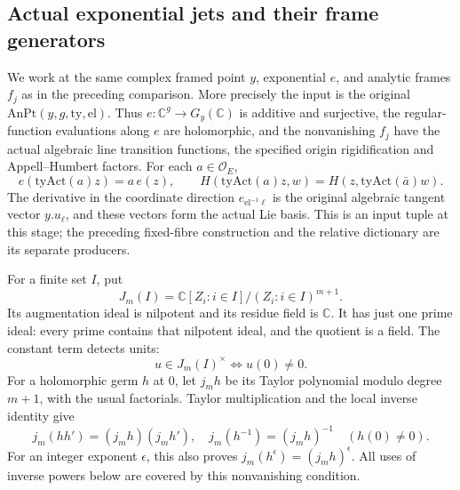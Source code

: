 \subsection{Actual exponential jets and their frame generators}
\label{subsec:ftb-actual-exponential-jets}

We work at the same complex framed point \(y\), exponential \(e\),
and analytic frames \(f_j\) as in the preceding comparison.
More precisely the input is the original \(\mathrm{AnPt}(y,g,\mathrm{ty},\mathrm{el})\).
Thus \(e:\mathbb C^g\to G_y(\mathbb C)\) is additive and surjective,
the regular-function evaluations along \(e\) are holomorphic,
and the nonvanishing \(f_j\) have the actual algebraic line
transition functions, the specified origin rigidification and
Appell--Humbert factors.
For each \(a\in\mathcal O_E\),
\[
 e(\mathrm{tyAct}(a)z)=a\,e(z),\qquad
 H(\mathrm{tyAct}(a)z,w)=H(z,\mathrm{tyAct}(\bar a)w).
                                                               \tag{AJ1}
\]
The derivative in the coordinate direction
\(e_{\mathrm{el}^{-1}\ell}\) is the original algebraic tangent
vector \(y.u_\ell\), and these vectors form the actual Lie basis.
This is an input tuple at this stage; the preceding fixed-fibre
construction and the relative dictionary are its separate producers.

For a finite set \(I\), put
\[
 J_m(I)=\mathbb C[Z_i:i\in I]/(Z_i:i\in I)^{m+1}.
\]
Its augmentation ideal is nilpotent and its residue field is
\(\mathbb C\). It has just one prime ideal: every prime contains
that nilpotent ideal, and the quotient is a field.
The constant term detects units:
\[
                        u\in J_m(I)^\times
                         \Longleftrightarrow u(0)\ne0.    \tag{AJ2}
\]
For a holomorphic germ \(h\) at \(0\), let \(j_mh\) be its
Taylor polynomial modulo degree \(m+1\), with the usual factorials.
Taylor multiplication and the local inverse identity give
\[
 j_m(hh')=(j_mh)(j_mh'),\quad
 j_m(h^{-1})=(j_mh)^{-1}\quad(h(0)\ne0).                   \tag{AJ3}
\]
For an integer exponent \(\epsilon\), this also proves
\(j_m(h^\epsilon)=(j_mh)^\epsilon\).
All uses of inverse powers below are covered by this nonvanishing
condition.

